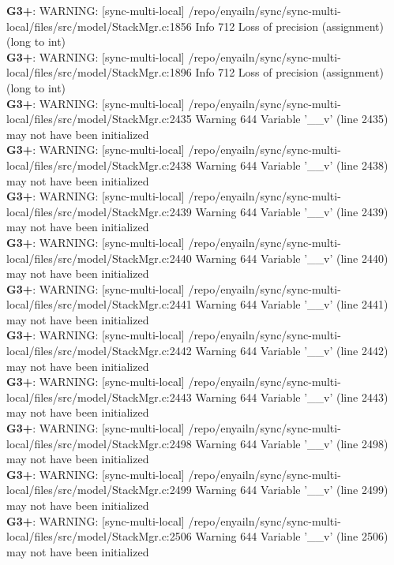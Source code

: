 \documentclass[12pt,twoside]{article}
\begin{document}
\textbf{G3+}: WARNING: [sync-multi-local] /repo/enyailn/sync/sync-multi-local/files/src/model/StackMgr.c:1856 Info 712 Loss of precision (assignment) (long to int)\\ 
\textbf{G3+}: WARNING: [sync-multi-local] /repo/enyailn/sync/sync-multi-local/files/src/model/StackMgr.c:1896 Info 712 Loss of precision (assignment) (long to int)\\ 
\textbf{G3+}: WARNING: [sync-multi-local] /repo/enyailn/sync/sync-multi-local/files/src/model/StackMgr.c:2435 Warning 644 Variable '\_\_v' (line 2435) may not have been initialized\\ 
\textbf{G3+}: WARNING: [sync-multi-local] /repo/enyailn/sync/sync-multi-local/files/src/model/StackMgr.c:2438 Warning 644 Variable '\_\_v' (line 2438) may not have been initialized\\ 
\textbf{G3+}: WARNING: [sync-multi-local] /repo/enyailn/sync/sync-multi-local/files/src/model/StackMgr.c:2439 Warning 644 Variable '\_\_v' (line 2439) may not have been initialized\\ 
\textbf{G3+}: WARNING: [sync-multi-local] /repo/enyailn/sync/sync-multi-local/files/src/model/StackMgr.c:2440 Warning 644 Variable '\_\_v' (line 2440) may not have been initialized\\ 
\textbf{G3+}: WARNING: [sync-multi-local] /repo/enyailn/sync/sync-multi-local/files/src/model/StackMgr.c:2441 Warning 644 Variable '\_\_v' (line 2441) may not have been initialized\\ 
\textbf{G3+}: WARNING: [sync-multi-local] /repo/enyailn/sync/sync-multi-local/files/src/model/StackMgr.c:2442 Warning 644 Variable '\_\_v' (line 2442) may not have been initialized\\ 
\textbf{G3+}: WARNING: [sync-multi-local] /repo/enyailn/sync/sync-multi-local/files/src/model/StackMgr.c:2443 Warning 644 Variable '\_\_v' (line 2443) may not have been initialized\\ 
\textbf{G3+}: WARNING: [sync-multi-local] /repo/enyailn/sync/sync-multi-local/files/src/model/StackMgr.c:2498 Warning 644 Variable '\_\_v' (line 2498) may not have been initialized\\ 
\textbf{G3+}: WARNING: [sync-multi-local] /repo/enyailn/sync/sync-multi-local/files/src/model/StackMgr.c:2499 Warning 644 Variable '\_\_v' (line 2499) may not have been initialized\\ 
\textbf{G3+}: WARNING: [sync-multi-local] /repo/enyailn/sync/sync-multi-local/files/src/model/StackMgr.c:2506 Warning 644 Variable '\_\_v' (line 2506) may not have been initialized\\ 
\end{document}
